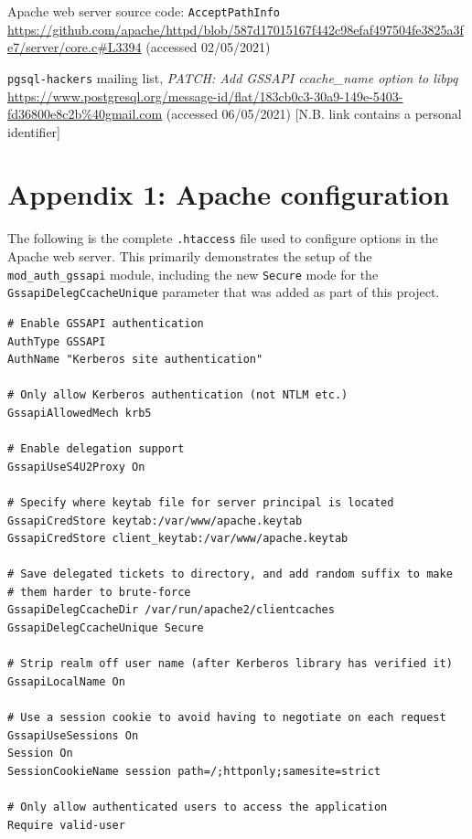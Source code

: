 \documentclass{report}
\begin{document}
\begin{thebibliography}{99}
 Apache web server source code: \texttt{AcceptPathInfo} \url{https://github.com/apache/httpd/blob/587d17015167f442c98efaf497504fe3825a3fe7/server/core.c#L3394} (accessed 02/05/2021)

 \texttt{pgsql-hackers} mailing list, \textit{PATCH: Add GSSAPI ccache\_name option to libpq} \url{https://www.postgresql.org/message-id/flat/183cb0c3-30a9-149e-5403-fd36800e8c2b%40gmail.com} (accessed 06/05/2021) [N.B. link contains a personal identifier]


\end{thebibliography}

\chapter*{Appendix 1: Apache configuration}
\label{sec:appendix1}
The following is the complete \verb+.htaccess+ file used to configure options in the Apache web server. This primarily demonstrates the setup of the \verb+mod_auth_gssapi+ module, including the new \texttt{Secure} mode for the \texttt{GssapiDelegCcacheUnique} parameter that was added as part of this project.

\begin{verbatim}
# Enable GSSAPI authentication
AuthType GSSAPI
AuthName "Kerberos site authentication"

# Only allow Kerberos authentication (not NTLM etc.)
GssapiAllowedMech krb5

# Enable delegation support
GssapiUseS4U2Proxy On

# Specify where keytab file for server principal is located
GssapiCredStore keytab:/var/www/apache.keytab
GssapiCredStore client_keytab:/var/www/apache.keytab

# Save delegated tickets to directory, and add random suffix to make
# them harder to brute-force
GssapiDelegCcacheDir /var/run/apache2/clientcaches
GssapiDelegCcacheUnique Secure

# Strip realm off user name (after Kerberos library has verified it)
GssapiLocalName On

# Use a session cookie to avoid having to negotiate on each request
GssapiUseSessions On
Session On
SessionCookieName session path=/;httponly;samesite=strict

# Only allow authenticated users to access the application
Require valid-user
\end{verbatim}
\end{document}
